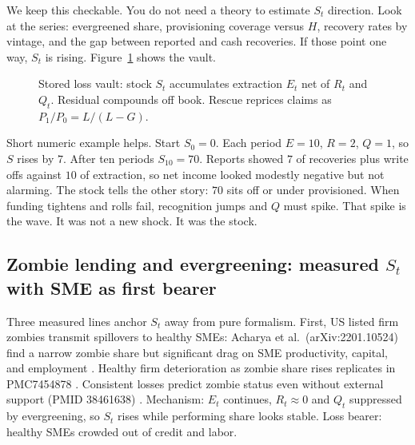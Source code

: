 \documentclass[11pt]{article}
\begin{document}
We keep this checkable. You do not need a theory to estimate $S_t$ direction. Look at the series: evergreened share, provisioning coverage versus $H$, recovery rates by vintage, and the gap between reported and cash recoveries. If those point one way, $S_t$ is rising. Figure~\ref{fig:stored} shows the vault.

\begin{figure}[h]
\centering
{}
\caption{Stored loss vault: stock $S_t$ accumulates extraction $E_t$ net of $R_t$ and $Q_t$. Residual compounds off book. Rescue reprices claims as $P_1/P_0=L/(L-G)$.}
\label{fig:stored}
\end{figure}

Short numeric example helps. Start $S_0=0$. Each period $E=10$, $R=2$, $Q=1$, so $S$ rises by $7$. After ten periods $S_{10}=70$. Reports showed $7$ of recoveries plus write offs against $10$ of extraction, so net income looked modestly negative but not alarming. The stock tells the other story: $70$ sits off or under provisioned. When funding tightens and rolls fail, recognition jumps and $Q$ must spike. That spike is the wave. It was not a new shock. It was the stock.

\subsection{Zombie lending and evergreening: measured $S_t$ with SME as first bearer}
Three measured lines anchor $S_t$ away from pure formalism. First, US listed firm zombies transmit spillovers to healthy SMEs: Acharya et al.\ (arXiv:2201.10524) find a narrow zombie share but significant drag on SME productivity, capital, and employment \citep{acharya2022zombie}. Healthy firm deterioration as zombie share rises replicates in PMC7454878 \citep{pmc7454878}. Consistent losses predict zombie status even without external support (PMID 38461638) \citep{pmid38461638}. Mechanism: $E_t$ continues, $R_t \approx 0$ and $Q_t$ suppressed by evergreening, so $S_t$ rises while performing share looks stable. Loss bearer: healthy SMEs crowded out of credit and labor.
\end{document}
